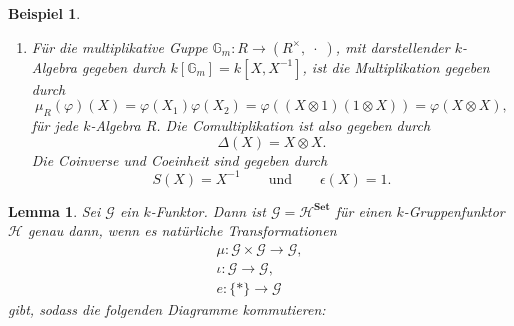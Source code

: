 \documentclass[a4paper, 11pt]{scrartcl}
\newcommand{\id}{\text{id}}
\theoremstyle{basicstyle}
\newtheorem{beispiel}[definition]{Beispiel}
\newtheorem{lemma}[definition]{Lemma}
\begin{document}
\begin{beispiel}
\begin{enumerate}
            \item Für die multiplikative Guppe \(\mathbb{G}_m : R \to (R^\times, \;\cdot\;)\), mit darstellender \(k\)-Algebra gegeben durch \(k[\mathbb{G}_m] = k[X, X^{-1}]\), ist die Multiplikation gegeben durch
                \[\mu_R(\varphi)(X) = \varphi(X_1)\varphi(X_2) = \varphi((X \otimes 1)(1 \otimes X)) = \varphi(X \otimes X),\]
                für jede \(k\)-Algebra \(R\).
                Die Comultiplikation ist also gegeben durch 
                \[\Delta (X) = X \otimes X.\]
                Die Coinverse und Coeinheit sind gegeben durch
                \[S(X) = X^{-1} \qquad\text{und}\qquad \epsilon(X) = 1.\]
        \end{enumerate}
    \end{beispiel}

    \begin{lemma}\label{lem:1}
        Sei \(\mathcal{G}\) ein \(k\)-Funktor.
        Dann ist \(\mathcal{G} = \mathcal{H}^{\textbf{Set}}\) für einen \(k\)-Gruppenfunktor \(\mathcal{H}\) genau dann, wenn es natürliche Transformationen
        \begin{gather*}
            \mu: \mathcal{G} \times \mathcal{G} \longrightarrow \mathcal{G}, \\
            \iota: \mathcal{G} \longrightarrow \mathcal{G}, \\
            e: \{\ast\} \longrightarrow \mathcal{G}
        \end{gather*}
        gibt, sodass die folgenden Diagramme kommutieren:
        \begin{figure*}[ht!]
            \centering
        \end{figure*}
        \begin{figure*}[ht!]
            \centering
            \hspace*{4em}

\end{figure*}
\end{lemma}
\end{document}
